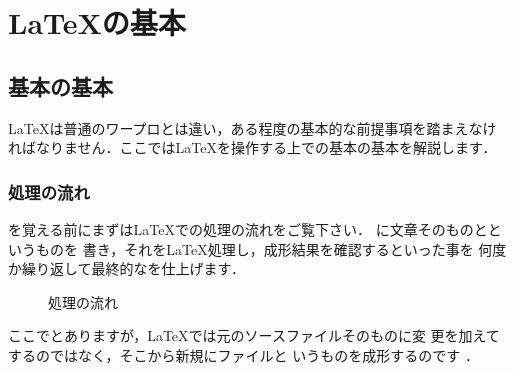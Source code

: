\chapter{\LaTeX の基本}

\begin{abstract}
まずは操作方法などの{\LaTeX}の基本を説明します．コンピュータの基本操作に
関する部分は大雑把にしか解説していませんので，適宜参考書を参照してくだ
さい．
\end{abstract}

\section{基本の基本}
\LaTeX は普通のワープロとは違い，ある程度の基本的な前提事項を踏まえなけ
ればなりません．ここでは\LaTeX を操作する上での基本の基本を解説します．


\subsection{処理の流れ}

を覚える前にまずは{\LaTeX}での処理の流れをご覧下さい．
に文章そのものとというものを
書き，それを{\LaTeX}処理し，成形結果を確認するといった事を
何度か繰り返して最終的なを仕上げます．
\begin{figure}[htbp]
 \begin{center}
  
  \usebox\graph
  \caption{処理の流れ}
 \end{center}
\end{figure}
ここでとありますが，{\LaTeX}では元のソースファイルそのものに変
更を加えてするのではなく，そこから新規にファイルと
いうものを成形するのです ．

